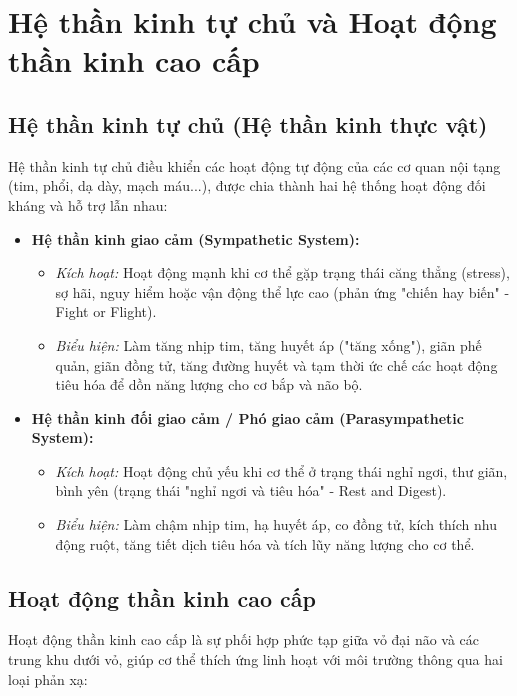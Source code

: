 \section{Hệ thần kinh tự chủ và Hoạt động thần kinh cao cấp}

\subsection{Hệ thần kinh tự chủ (Hệ thần kinh thực vật)}

Hệ thần kinh tự chủ điều khiển các hoạt động tự động của các cơ quan nội tạng (tim, phổi, dạ dày, mạch máu...), được chia thành hai hệ thống hoạt động đối kháng và hỗ trợ lẫn nhau:

\begin{itemize}
    \item \textbf{Hệ thần kinh giao cảm (Sympathetic System):}
    \begin{itemize}
        \item \textit{Kích hoạt:} Hoạt động mạnh khi cơ thể gặp trạng thái căng thẳng (stress), sợ hãi, nguy hiểm hoặc vận động thể lực cao (phản ứng "chiến hay biến" - Fight or Flight).
        \item \textit{Biểu hiện:} Làm tăng nhịp tim, tăng huyết áp ("tăng xống"), giãn phế quản, giãn đồng tử, tăng đường huyết và tạm thời ức chế các hoạt động tiêu hóa để dồn năng lượng cho cơ bắp và não bộ.
    \end{itemize}

    \item \textbf{Hệ thần kinh đối giao cảm / Phó giao cảm (Parasympathetic System):}
    \begin{itemize}
        \item \textit{Kích hoạt:} Hoạt động chủ yếu khi cơ thể ở trạng thái nghỉ ngơi, thư giãn, bình yên (trạng thái "nghỉ ngơi và tiêu hóa" - Rest and Digest).
        \item \textit{Biểu hiện:} Làm chậm nhịp tim, hạ huyết áp, co đồng tử, kích thích nhu động ruột, tăng tiết dịch tiêu hóa và tích lũy năng lượng cho cơ thể.
    \end{itemize}
\end{itemize}

\subsection{Hoạt động thần kinh cao cấp}

Hoạt động thần kinh cao cấp là sự phối hợp phức tạp giữa vỏ đại não và các trung khu dưới vỏ, giúp cơ thể thích ứng linh hoạt với môi trường thông qua hai loại phản xạ:

